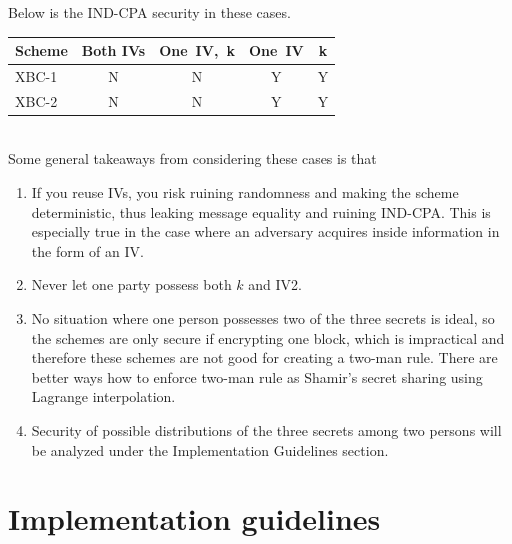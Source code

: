 \documentclass[conference]{IEEEtran}
\begin{document}
Below is the IND-CPA security in these cases. \\

\begin{tabular}{| l | c c c c | }
\hline
  Scheme & Both IVs & One\ IV,\ k & One\ IV & k \\ \hline
  XBC-1 & N & N & Y & Y \\
  XBC-2 & N & N & Y & Y \\
\hline
\end{tabular} \\

Some general takeaways from considering these cases is that

\begin{enumerate}
  \item If you reuse IVs, you risk ruining randomness and making the scheme deterministic, thus leaking message equality and ruining IND-CPA. This is especially true in the case where an adversary acquires inside information in the form of an IV.
  \item Never let one party possess both $k$ and IV2.
  \item No situation where one person possesses two of the three secrets is ideal, so the schemes are only secure if encrypting one block, which is impractical and therefore these schemes are not good for creating a two-man rule. There are better ways how to enforce two-man rule as Shamir's secret sharing using Lagrange interpolation. \cite{shamir}
  \item Security of possible distributions of the three secrets among two persons will be analyzed under the Implementation Guidelines section.
\end{enumerate}

\section{Implementation guidelines}

\end{document}
